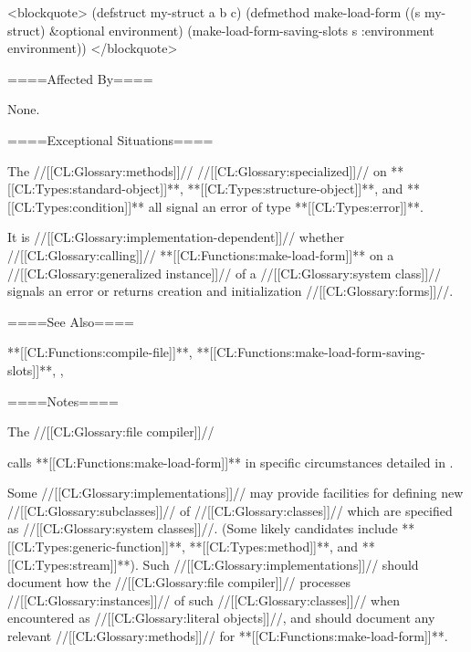 \smallbreak <blockquote> (defstruct my-struct a b c) (defmethod make-load-form ((s my-struct) &optional environment) (make-load-form-saving-slots s :environment environment)) </blockquote>

====Affected By====

None.

====Exceptional Situations====

The //[[CL:Glossary:methods]]// //[[CL:Glossary:specialized]]// on **[[CL:Types:standard-object]]**, **[[CL:Types:structure-object]]**, and **[[CL:Types:condition]]** all signal an error of type **[[CL:Types:error]]**.


It is //[[CL:Glossary:implementation-dependent]]// whether //[[CL:Glossary:calling]]// **[[CL:Functions:make-load-form]]** on a //[[CL:Glossary:generalized instance]]// of a //[[CL:Glossary:system class]]// signals an error or returns creation and initialization //[[CL:Glossary:forms]]//.

====See Also====

**[[CL:Functions:compile-file]]**, **[[CL:Functions:make-load-form-saving-slots]]**, {\secref\CallingMakeLoadForm} {\secref\Evaluation}, {\secref\Compilation}

====Notes====

The //[[CL:Glossary:file compiler]]//

calls **[[CL:Functions:make-load-form]]** in specific circumstances detailed in \secref\CallingMakeLoadForm.

Some //[[CL:Glossary:implementations]]// may provide facilities for defining new //[[CL:Glossary:subclasses]]// of //[[CL:Glossary:classes]]// which are specified as //[[CL:Glossary:system classes]]//. (Some likely candidates include **[[CL:Types:generic-function]]**, **[[CL:Types:method]]**, and **[[CL:Types:stream]]**). Such //[[CL:Glossary:implementations]]// should document how the //[[CL:Glossary:file compiler]]// processes //[[CL:Glossary:instances]]// of such //[[CL:Glossary:classes]]// when encountered as //[[CL:Glossary:literal objects]]//, and should document any relevant //[[CL:Glossary:methods]]// for **[[CL:Functions:make-load-form]]**.

 
